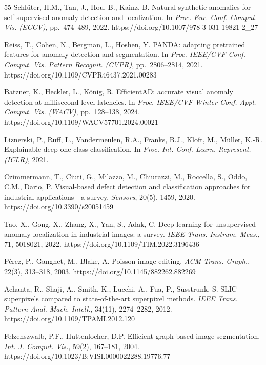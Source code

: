 \documentclass[lettersize,journal]{IEEEtran}
\begin{document}
\begin{thebibliography}{55}
Schl\"{u}ter, H.M., Tan, J., Hou, B., Kainz, B. Natural synthetic anomalies for self-supervised anomaly detection and localization. In \textit{Proc. Eur. Conf. Comput. Vis. (ECCV)}, pp.~474--489, 2022. https://doi.org/10.1007/978-3-031-19821-2\_27

Reiss, T., Cohen, N., Bergman, L., Hoshen, Y. PANDA: adapting pretrained features for anomaly detection and segmentation. In \textit{Proc. IEEE/CVF Conf. Comput. Vis. Pattern Recognit. (CVPR)}, pp.~2806--2814, 2021. https://doi.org/10.1109/CVPR46437.2021.00283

Batzner, K., Heckler, L., K\"{o}nig, R. EfficientAD: accurate visual anomaly detection at millisecond-level latencies. In \textit{Proc. IEEE/CVF Winter Conf. Appl. Comput. Vis. (WACV)}, pp.~128--138, 2024. https://doi.org/10.1109/WACV57701.2024.00021

Liznerski, P., Ruff, L., Vandermeulen, R.A., Franks, B.J., Kloft, M., M\"{u}ller, K.-R. Explainable deep one-class classification. In \textit{Proc. Int. Conf. Learn. Represent. (ICLR)}, 2021.

Czimmermann, T., Ciuti, G., Milazzo, M., Chiurazzi, M., Roccella, S., Oddo, C.M., Dario, P. Visual-based defect detection and classification approaches for industrial applications---a survey. \textit{Sensors}, 20(5), 1459, 2020. https://doi.org/10.3390/s20051459

Tao, X., Gong, X., Zhang, X., Yan, S., Adak, C. Deep learning for unsupervised anomaly localization in industrial images: a survey. \textit{IEEE Trans. Instrum. Meas.}, 71, 5018021, 2022. https://doi.org/10.1109/TIM.2022.3196436

P\'{e}rez, P., Gangnet, M., Blake, A. Poisson image editing. \textit{ACM Trans. Graph.}, 22(3), 313--318, 2003. https://doi.org/10.1145/882262.882269


Achanta, R., Shaji, A., Smith, K., Lucchi, A., Fua, P., S\"{u}sstrunk, S. SLIC superpixels compared to state-of-the-art superpixel methods. \textit{IEEE Trans. Pattern Anal. Mach. Intell.}, 34(11), 2274--2282, 2012. https://doi.org/10.1109/TPAMI.2012.120

Felzenszwalb, P.F., Huttenlocher, D.P. Efficient graph-based image segmentation. \textit{Int. J. Comput. Vis.}, 59(2), 167--181, 2004. https://doi.org/10.1023/B:VISI.0000022288.19776.77


\end{thebibliography}
\end{document}
